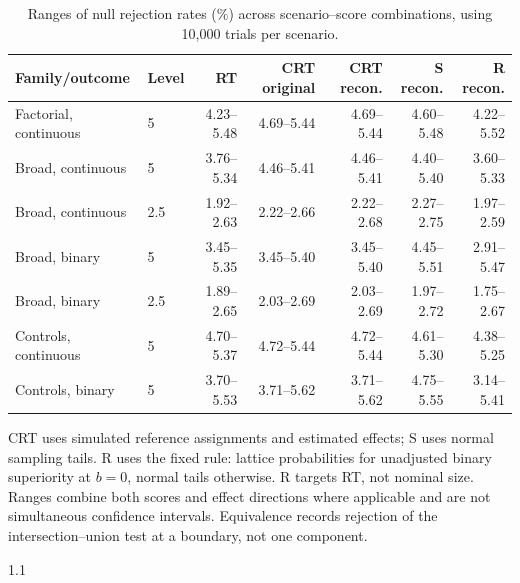 \documentclass[12pt,a4paper]{article}
\theoremstyle{definition}
\theoremstyle{remark}\newtheorem{remark}{Remark}
\numberwithin{equation}{section}
\begin{document}
\begin{table}[!htbp]\centering
\caption{Ranges of null rejection rates (\%) across scenario--score combinations, using 10,000 trials per scenario.}
\label{tab:supp-pilot-null}
\begin{threeparttable}\small
\begin{tabular}{@{}llrrrrr@{}}
\toprule
Family/outcome & Level & RT & CRT original & CRT recon. & S recon. & R recon.\\
\midrule
Factorial, continuous & 5 & 4.23--5.48 & 4.69--5.44 & 4.69--5.44 & 4.60--5.48 & 4.22--5.52\\
Broad, continuous & 5 & 3.76--5.34 & 4.46--5.41 & 4.46--5.41 & 4.40--5.40 & 3.60--5.33\\
Broad, continuous & 2.5 & 1.92--2.63 & 2.22--2.66 & 2.22--2.68 & 2.27--2.75 & 1.97--2.59\\
Broad, binary & 5 & 3.45--5.35 & 3.45--5.40 & 3.45--5.40 & 4.45--5.51 & 2.91--5.47\\
Broad, binary & 2.5 & 1.89--2.65 & 2.03--2.69 & 2.03--2.69 & 1.97--2.72 & 1.75--2.67\\
Controls, continuous & 5 & 4.70--5.37 & 4.72--5.44 & 4.72--5.44 & 4.61--5.30 & 4.38--5.25\\
Controls, binary & 5 & 3.70--5.53 & 3.71--5.62 & 3.71--5.62 & 4.75--5.55 & 3.14--5.41\\
\bottomrule\end{tabular}
\begin{tablenotes}[flushleft]\small
\item[] CRT uses simulated reference assignments and estimated effects; S uses normal sampling tails. R uses the fixed rule: lattice probabilities for unadjusted binary superiority at $b=0$, normal tails otherwise. R targets RT, not nominal size. Ranges combine both scores and effect directions where applicable and are not simultaneous confidence intervals. Equivalence records rejection of the intersection--union test at a boundary, not one component.
\end{tablenotes}\end{threeparttable}\end{table}
\clearpage

\begin{spacing}{1.1}


\end{spacing}
\end{document}
